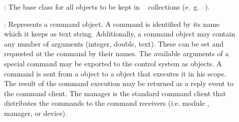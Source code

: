 \begin{description}

\item[] :  The base class for all objects to be kept in \dabc~ collections (e.~g.~ ).

\item[] : 
Represents a command object. A command 
   is identified by its name which it keeps as text string. Additionally, 
   a command object may contain any number of arguments (integer, double, text). 
   These can be set and requested at the command by their names. 
   The available arguments of a special command may be exported to the control 
   system as  objects. A command is sent from a 
    object to a  object
    that executes it in his scope. 
   The result of the command execution may be returned as a reply event to 
   the command client. The manager is the standard command client 
   that distributes the commands to the command receivers 
   (i.e. module , manager, or device). 


\end{description}
